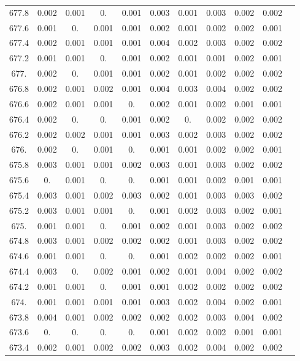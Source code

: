 \documentclass[12pt]{ctexart}
\numberwithin{equation}{section}
\begin{document}
\begin{longtable}{ccccccccccc}
677.8	&	0.002	&	0.001	&	0.	&	0.001	&	0.003	&	0.001	&	0.003	&	0.002	&	0.002	\\
677.6	&	0.001	&	0.	&	0.001	&	0.001	&	0.002	&	0.001	&	0.002	&	0.002	&	0.001	\\
677.4	&	0.002	&	0.001	&	0.001	&	0.001	&	0.004	&	0.002	&	0.003	&	0.002	&	0.002	\\
677.2	&	0.001	&	0.001	&	0.	&	0.001	&	0.002	&	0.001	&	0.001	&	0.002	&	0.001	\\
677.	&	0.002	&	0.	&	0.001	&	0.001	&	0.002	&	0.001	&	0.002	&	0.002	&	0.002	\\
676.8	&	0.002	&	0.001	&	0.002	&	0.001	&	0.004	&	0.003	&	0.004	&	0.002	&	0.002	\\
676.6	&	0.002	&	0.001	&	0.001	&	0.	&	0.002	&	0.001	&	0.002	&	0.001	&	0.001	\\
676.4	&	0.002	&	0.	&	0.	&	0.001	&	0.002	&	0.	&	0.002	&	0.002	&	0.002	\\
676.2	&	0.002	&	0.002	&	0.001	&	0.001	&	0.003	&	0.002	&	0.003	&	0.002	&	0.002	\\
676.	&	0.002	&	0.	&	0.001	&	0.	&	0.001	&	0.001	&	0.002	&	0.002	&	0.001	\\
675.8	&	0.003	&	0.001	&	0.001	&	0.002	&	0.003	&	0.001	&	0.003	&	0.002	&	0.002	\\
675.6	&	0.	&	0.001	&	0.	&	0.	&	0.001	&	0.001	&	0.002	&	0.001	&	0.001	\\
675.4	&	0.003	&	0.001	&	0.002	&	0.003	&	0.002	&	0.001	&	0.003	&	0.003	&	0.002	\\
675.2	&	0.003	&	0.001	&	0.001	&	0.	&	0.001	&	0.002	&	0.003	&	0.002	&	0.001	\\
675.	&	0.001	&	0.001	&	0.	&	0.001	&	0.002	&	0.001	&	0.003	&	0.002	&	0.002	\\
674.8	&	0.003	&	0.001	&	0.002	&	0.002	&	0.002	&	0.001	&	0.003	&	0.002	&	0.002	\\
674.6	&	0.001	&	0.001	&	0.	&	0.	&	0.001	&	0.002	&	0.002	&	0.002	&	0.001	\\
674.4	&	0.003	&	0.	&	0.002	&	0.001	&	0.002	&	0.001	&	0.004	&	0.002	&	0.002	\\
674.2	&	0.001	&	0.001	&	0.	&	0.001	&	0.001	&	0.002	&	0.002	&	0.002	&	0.002	\\
674.	&	0.001	&	0.001	&	0.001	&	0.001	&	0.003	&	0.002	&	0.004	&	0.002	&	0.001	\\
673.8	&	0.004	&	0.001	&	0.002	&	0.002	&	0.002	&	0.002	&	0.003	&	0.004	&	0.002	\\
673.6	&	0.	&	0.	&	0.	&	0.	&	0.001	&	0.002	&	0.002	&	0.001	&	0.001	\\
673.4	&	0.002	&	0.001	&	0.002	&	0.002	&	0.003	&	0.002	&	0.004	&	0.002	&	0.002	\\

\end{longtable}
\end{document}
